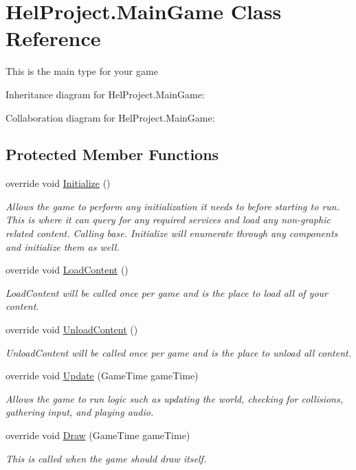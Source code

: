 \hypertarget{class_hel_project_1_1_main_game}{}\section{Hel\+Project.\+Main\+Game Class Reference}
\label{class_hel_project_1_1_main_game}


This is the main type for your game  




Inheritance diagram for Hel\+Project.\+Main\+Game\+:


Collaboration diagram for Hel\+Project.\+Main\+Game\+:
\subsection*{Protected Member Functions}
\begin{DoxyCompactItemize}
\item 
override void \hyperlink{class_hel_project_1_1_main_game_ada9330a851988897b9e0832853e34950}{Initialize} ()
\begin{DoxyCompactList}\small\item\em Allows the game to perform any initialization it needs to before starting to run. This is where it can query for any required services and load any non-\/graphic related content. Calling base. Initialize will enumerate through any components and initialize them as well. \end{DoxyCompactList}\item 
override void \hyperlink{class_hel_project_1_1_main_game_a2bc21b348062dd85d99efd3822af3e6a}{Load\+Content} ()
\begin{DoxyCompactList}\small\item\em Load\+Content will be called once per game and is the place to load all of your content. \end{DoxyCompactList}\item 
override void \hyperlink{class_hel_project_1_1_main_game_a39242071cf9919f8a8641be9e8396634}{Unload\+Content} ()
\begin{DoxyCompactList}\small\item\em Unload\+Content will be called once per game and is the place to unload all content. \end{DoxyCompactList}\item 
override void \hyperlink{class_hel_project_1_1_main_game_a9ac722d731f12668bb191921101dbba5}{Update} (Game\+Time game\+Time)
\begin{DoxyCompactList}\small\item\em Allows the game to run logic such as updating the world, checking for collisions, gathering input, and playing audio. \end{DoxyCompactList}\item 
override void \hyperlink{class_hel_project_1_1_main_game_a8c0f9655e1d757dad7c35cf5a4529035}{Draw} (Game\+Time game\+Time)
\begin{DoxyCompactList}\small\item\em This is called when the game should draw itself. \end{DoxyCompactList}\end{DoxyCompactItemize}
